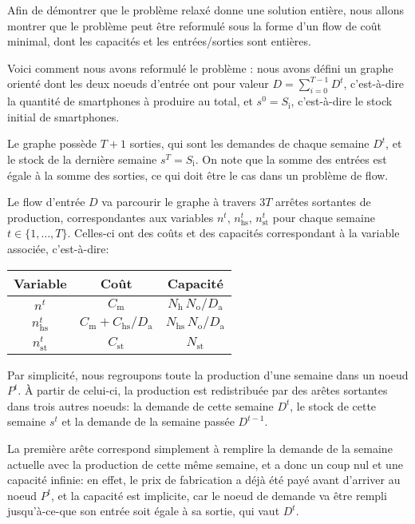 Afin de démontrer que le problème relaxé donne une solution entière, nous allons montrer que le problème peut être reformulé sous la forme d'un flow de coût minimal, dont les capacités et les entrées/sorties sont entières.

Voici comment nous avons reformulé le problème : nous avons défini un graphe orienté dont les deux noeuds d'entrée ont pour valeur $D=\sum_{i=0}^{T-1} D^t$, c'est-à-dire la quantité de smartphones à produire au total, et $s^0 = S_\mathrm{i}$, c'est-à-dire le stock initial de smartphones.

Le graphe possède $T+1$ sorties, qui sont les demandes de chaque semaine $D^t$, et le stock de la dernière semaine $s^T = S_\mathrm{i}$. On note que la somme des entrées est égale à la somme des sorties, ce qui doit être le cas dans un problème de flow.

Le flow d'entrée $D$ va parcourir le graphe à travers $3T$ arrêtes sortantes de \og{}production\fg{}, correspondantes aux variables $n^t$, $n_\mathrm{hs}^t$, $n_\mathrm{st}^t$ pour chaque semaine $t \in \{1,\dots,T\}$. Celles-ci ont des coûts et des capacités correspondant à la variable associée, c'est-à-dire:
\begin{center}
\begin{tabular}{c|cc}
    \textbf{Variable} & \textbf{Coût} & \textbf{Capacité} \\
    \hline
    $n^t$ & $C_\mathrm{m}$ & $N_\mathrm{h}\,N_\mathrm{o}/D_\mathrm{a}$ \\
    \hline
    $n_\mathrm{hs}^t$ & $C_\mathrm{m}+C_\mathrm{hs}/D_\mathrm{a}$ & $N_\mathrm{hs}\,N_\mathrm{o}/D_\mathrm{a}$ \\
    \hline
    $n_\mathrm{st}^t$ & $C_\mathrm{st}$ & $N_\mathrm{st}$ \\
\end{tabular}
\end{center}

Par simplicité, nous regroupons toute la production d'une semaine dans un noeud $P^t$. À partir de celui-ci, la production est redistribuée par des arêtes sortantes dans trois autres noeuds: la demande de cette semaine $D^t$, le stock de cette semaine $s^t$ et la demande de la semaine passée $D^{t-1}$.

La première arête correspond simplement à remplire la demande de la semaine actuelle avec la production de cette même semaine, et a donc un coup nul et une capacité infinie: en effet, le prix de fabrication a déjà été payé avant d'arriver au noeud $P^t$, et la capacité est implicite, car le noeud de demande va être rempli jusqu'à-ce-que son entrée soit égale à sa sortie, qui vaut $D^t$.

